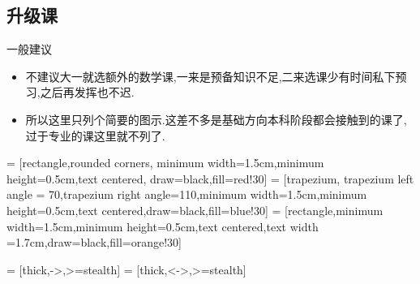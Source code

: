 \documentclass[pdf]{beamer}
\numberwithin{equation}{section}
\theoremstyle{plain}
\theoremstyle{plain}
\theoremstyle{plain}
\theoremstyle{remark}
\begin{document}
\subsection{升级课}
\begin{frame}{一般建议}
	\begin{itemize}
		\item 不建议大一就选额外的数学课,一来是预备知识不足,二来选课少有时间私下预习,之后再发挥也不迟.
		\item 所以这里只列个简要的图示.这差不多是基础方向本科阶段都会接触到的课了,过于专业的课这里就不列了.
	\end{itemize}
\end{frame}
\begin{frame}
 = [rectangle,rounded corners, minimum width=1.5cm,minimum height=0.5cm,text centered, draw=black,fill=red!30]
 = [trapezium, trapezium left angle = 70,trapezium right angle=110,minimum width=1.5cm,minimum height=0.5cm,text centered,draw=black,fill=blue!30]
 = [rectangle,minimum width=1.5cm,minimum height=0.5cm,text centered,text width =1.7cm,draw=black,fill=orange!30]

 = [thick,->,>=stealth]
 = [thick,<->,>=stealth]


\end{frame}
\end{document}
